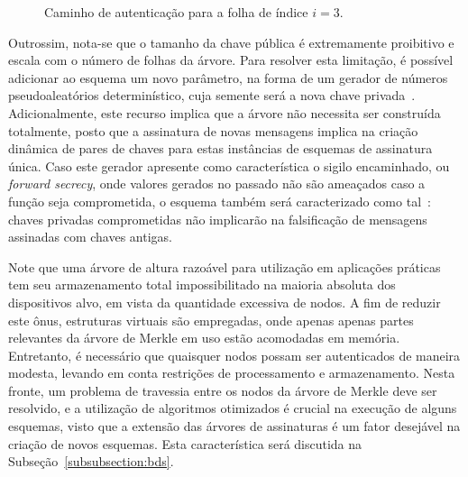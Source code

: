 \documentclass{ufsctex/ufsctex}
\newcommand{\pk}{\mathcal{P}_k}
\begin{document}
\begin{figure}
  \centering
  \caption{Caminho de autenticação para a folha de índice $i = 3$.}\label{fig:9}
\end{figure}

Outrossim, nota-se que o tamanho da chave pública é extremamente proibitivo e
escala com o número de folhas da árvore. Para resolver esta limitação, é
possível adicionar ao esquema um novo parâmetro, na forma de um gerador de
números pseudoaleatórios determinístico, cuja semente será a nova chave
privada~\cite[Subseção 6.4.2.3]{Goldreich:book:2004}. Adicionalmente, este
recurso implica que a árvore não necessita ser construída totalmente, posto que
a assinatura de novas mensagens implica na criação dinâmica de pares de chaves
para estas instâncias de esquemas de assinatura única. Caso este gerador
apresente como característica o sigilo encaminhado, ou \emph{forward secrecy},
onde valores gerados no passado não são ameaçados caso a função seja
comprometida, o esquema também será caracterizado como tal~\cite[pp.
45]{Bernstein:book:2008}: chaves privadas comprometidas não implicarão na
falsificação de mensagens assinadas com chaves antigas.

Note que uma árvore de altura razoável para utilização em aplicações práticas
tem seu armazenamento total impossibilitado na maioria absoluta dos
dispositivos alvo, em vista da quantidade excessiva de nodos. A fim de reduzir
este ônus, estruturas virtuais são empregadas, onde apenas apenas partes
relevantes da árvore de Merkle em uso estão acomodadas em memória. Entretanto,
é necessário que quaisquer nodos possam ser autenticados de maneira modesta,
levando em conta restrições de processamento e armazenamento. Nesta fronte, um
problema de travessia entre os nodos da árvore de Merkle deve ser resolvido, e
a utilização de algoritmos otimizados é crucial na execução de alguns esquemas,
visto que a extensão das árvores de assinaturas é um fator desejável na criação
de novos esquemas. Esta característica será discutida na
Subseção~\ref{subsubsection:bds}.
\end{document}
